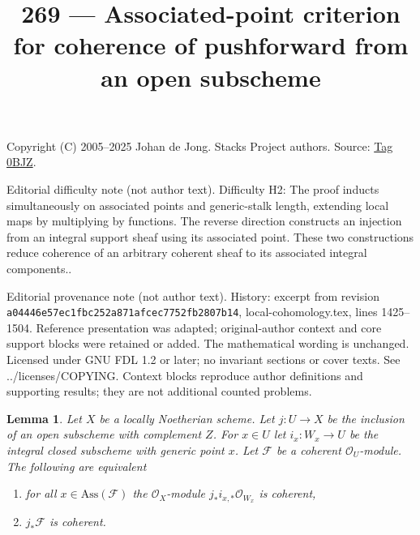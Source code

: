 \documentclass{amsart}
\theoremstyle{plain}
\newtheorem{lemma}[subsection]{Lemma}
\theoremstyle{definition}
\theoremstyle{remark}
\numberwithin{equation}{subsection}
\begin{document}
\title[Stacks Project, Tag 0BJZ]{269 --- Associated-point criterion for coherence of pushforward from an open subscheme}
\maketitle
\noindent Copyright (C) 2005--2025 Johan de Jong. Stacks Project authors. Source: \href{https://stacks.math.columbia.edu/tag/0BJZ}{Tag 0BJZ}.

\noindent Editorial difficulty note (not author text). Difficulty H2: The proof inducts simultaneously on associated points and generic-stalk length, extending local maps by multiplying by functions. The reverse direction constructs an injection from an integral support sheaf using its associated point. These two constructions reduce coherence of an arbitrary coherent sheaf to its associated integral components..

\noindent Editorial provenance note (not author text). History: excerpt from revision \texttt{a0444\allowbreak 6e57e\allowbreak c1fbc\allowbreak 252a8\allowbreak 71afc\allowbreak ec775\allowbreak 2fb28\allowbreak 07b14}, local-cohomology.tex, lines 1425--1504. Reference presentation was adapted; original-author context and core support blocks were retained or added. The mathematical wording is unchanged. Licensed under GNU FDL 1.2 or later; no invariant sections or cover texts. See ../licenses/COPYING. Context blocks reproduce author definitions and supporting results; they are not additional counted problems.

\begin{lemma}
\label{lemma-check-finiteness-pushforward-on-associated-points}
Let $X$ be a locally Noetherian scheme. Let $j : U \to X$ be the inclusion
of an open subscheme with complement $Z$. For $x \in U$ let
$i_x : W_x \to U$ be the integral closed subscheme with generic point $x$.
Let $\mathcal{F}$ be a coherent $\mathcal{O}_U$-module.
The following are equivalent
\begin{enumerate}
\item for all $x \in \text{Ass}(\mathcal{F})$ the
$\mathcal{O}_X$-module $j_*i_{x, *}\mathcal{O}_{W_x}$ is coherent,
\item $j_*\mathcal{F}$ is coherent.
\end{enumerate}
\end{lemma}
\end{document}

